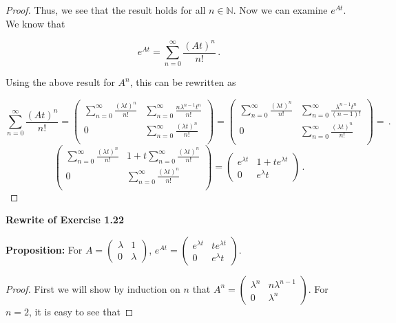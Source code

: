\documentclass[a4paper]{article}
\numberwithin{equation}{section}
\begin{document}
\begin{description}
\begin{proof}
Thus, we see that the result holds for all $n \in \mathbb{N}$. Now we can examine $e^{At}$. We know that 

$$e^{At} = \sum_{n=0}^{\infty} \frac{(At)^n}{n!}\,.$$

Using the above result for $A^n$, this can be rewritten as

$$\sum_{n=0}^{\infty} \frac{(At)^n}{n!} = \begin{pmatrix}
\sum_{n=0}^{\infty} \frac{(\lambda t)^n}{n!} & \sum_{n=0}^{\infty} \frac{n\lambda^{n-1} t^n}{n!} \\
0 & \sum_{n=0}^{\infty} \frac{(\lambda t)^n}{n!} \\
\end{pmatrix} = 
\begin{pmatrix}
\sum_{n=0}^{\infty} \frac{(\lambda t)^n}{n!} & \sum_{n=0}^{\infty} \frac{\lambda^{n-1} t^n}{(n-1)!} \\
0 & \sum_{n=0}^{\infty} \frac{(\lambda t)^n}{n!} \\
\end{pmatrix} = \,.$$
$$\begin{pmatrix}
\sum_{n=0}^{\infty} \frac{(\lambda t)^n}{n!} & 1+ t\sum_{n=0}^{\infty} \frac{(\lambda t)^n}{n!} \\
0 & \sum_{n=0}^{\infty} \frac{(\lambda t)^n}{n!} \\
\end{pmatrix} = \begin{pmatrix}
e^{{\lambda}t} & 1+te^{{\lambda}t} \\
0 & {e^{\lambda}t}
\end{pmatrix}\,.$$

\end{proof}

\item \textbf{Rewrite of Exercise 1.22}

\item \textbf{Proposition: }For $A = \begin{pmatrix}
\lambda & 1 \\
0 & \lambda
\end{pmatrix}$, $e^{At} = \begin{pmatrix}
e^{{\lambda}t} & te^{{\lambda}t} \\
0 & {e^{\lambda}t}
\end{pmatrix}$.

\begin{proof} First we will show by induction on $n$ that $A^n = \begin{pmatrix}
\lambda^n & n\lambda^{n-1} \\
0 & \lambda^n
\end{pmatrix}$. For $n = 2$, it is easy to see that


\end{proof}
\end{description}
\end{document}
